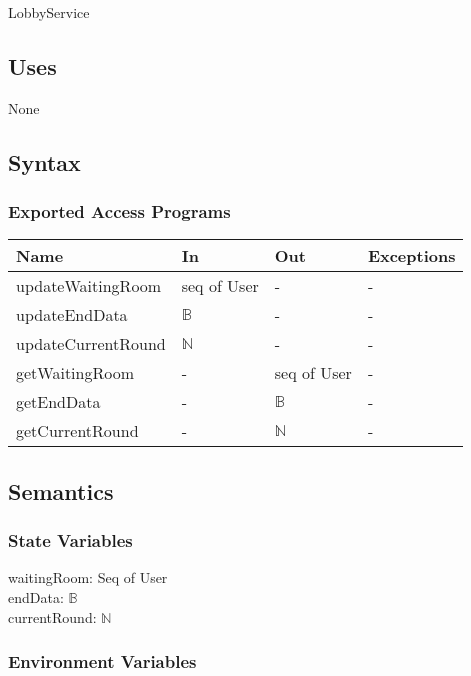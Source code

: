 \documentclass[12pt, titlepage]{article}
\begin{document}
LobbyService

\subsection{Uses}
None

\subsection{Syntax}

\subsubsection{Exported Access Programs}

\begin{center}
\begin{tabular}{| p{5cm} | p{4cm} | p{2.2cm} | p{2.25cm} |}
\hline
\textbf{Name} & \textbf{In} & \textbf{Out} & \textbf{Exceptions} \\
\hline
updateWaitingRoom & seq of User & - & - \\
\hline
updateEndData & $\mathbb{B}$ & - & - \\
\hline
updateCurrentRound & $\mathbb{N}$& - & - \\
\hline
getWaitingRoom & - & seq of User & - \\
\hline
getEndData & - & $\mathbb{B}$ & - \\
\hline
getCurrentRound & - & $\mathbb{N}$ & - \\



\hline
\end{tabular}
\end{center}

\subsection{Semantics}

\subsubsection{State Variables}

waitingRoom: Seq of User \\
endData: $\mathbb{B}$ \\
currentRound: $\mathbb{N}$

\subsubsection{Environment Variables}
\end{document}
